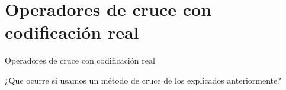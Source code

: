\documentclass[10pt]{beamer}
\begin{document}
%
%
%	



\section{Operadores de cruce con codificación real}

\begin{frame}{Operadores de cruce con codificación real}
	\begin{center}
		\huge ¿Que ocurre si usamos un método de cruce de los explicados anteriormente?
	\end{center}
		
\end{frame}
\end{document}

